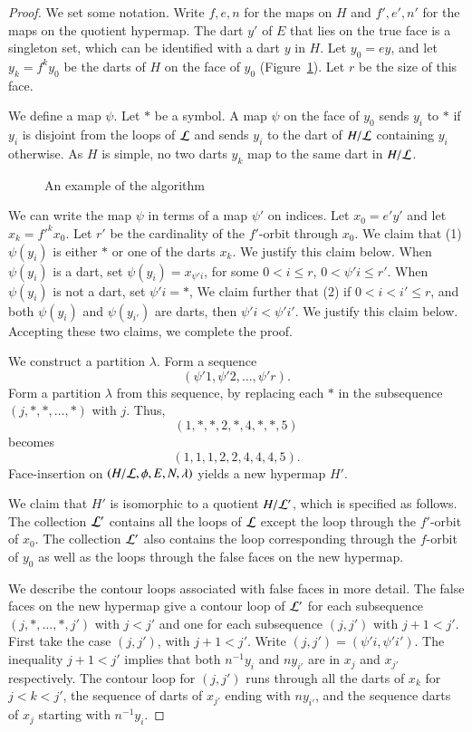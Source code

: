 \begin{proof}  We set some notation.
Write $f,e,n$ for the maps on $H$ and $f',e',n'$ for the maps on the
quotient hypermap.   
The dart $y'$ of $E$ that 
lies on the true face is a
singleton set, which can be identified with a dart $y$ in $H$.  Let
$y_0 = e y$, and let $y_k = {f}^k y_0$ be the darts of $H$ on the
face of $y_0$ (Figure~\ref{fig:algordart}).  
Let $r$ be the size of this face. 

We define a map $\psi$.
Let $*$ be a symbol.
A map
$\psi$ on the face of $y_0$ sends 
$y_i$ to $*$ if $y_i$ is disjoint from
the loops of ${\cal L}$ and sends $y_i$
to the dart of $H/{\cal L}$
containing $y_i$ otherwise.
As $H$ is simple, no two darts
$y_k$ map to the same dart in $H/{\cal L}$.
\begin{figure}[htb]
  \centering
  \caption{An example of the algorithm}
  \label{fig:algordart}
\end{figure}

We can write the map $\psi$ in terms of a map $\psi'$ on indices.
Let $x_0 = e' y'$ and let $x_k = {f'}^k x_0$.  Let $r'$ be the
cardinality of the $f'$-orbit through $x_0$.  
We claim that (1) $\psi(y_i)$ is either $*$ or one of the
darts $x_k$.  We justify this claim below.
When $\psi(y_i)$ is a dart, set $\psi(y_i) =
x_{\psi' i}$, for some $0< i \le r$, $0 < \psi' i \le r'$. 
When $\psi(y_i)$ is not a dart,
set $\psi' i = *$, 
We claim further that (2) if
$0< i< i'\le r$, and both $\psi(y_i)$ and $\psi(y_{i'})$ are darts, then
$\psi' i < \psi' i'$.  We justify this claim below.
Accepting these two claims, we complete the proof.    

We construct a partition $\lambda$.
Form a sequence
    $$(\psi' 1,\psi' 2,\ldots,\psi' r).$$
Form a partition $\lambda$ from this sequence, 
by replacing each $*$ in the
subsequence $(j,*,*,\ldots,*)$ with $j$. Thus,
    $$(1,*,*,2,*,4,*,*,5)$$
becomes
    $$(1,1,1,2,2,4,4,4,5).$$
Face-insertion on $(H/{\cal L},\phi,E,N,\lambda)$ yields a new
hypermap $H'$.  

We claim that $H'$ is isomorphic to a quotient
$H/{\cal L}'$, which is specified as follows. The collection
${\cal L}'$ contains all the loops of ${\cal L}$ 
except the loop through the $f'$-orbit of $x_0$.  The collection
${\cal L}'$ also contains
the loop corresponding through the $f$-orbit
of $y_0$ as well as the loops through the false faces on
the new hypermap.  

We describe the contour loops associated with false faces 
in more detail.
The false faces on the new hypermap give a
contour loop of ${\cal L}'$ for each subsequence
$(j,*,\ldots,*,j')$ with $j< j'$ 
and one for each subsequence $(j,j')$ with
$j+1< j'$.  
First take the case $(j,j')$, with $j+1<j'$. 
Write $(j,j') = (\psi'i,\psi' i')$.
The inequality $j+1<j'$ implies that both $n^{-1}
y_i$ and $n y_{i'}$ are in $x_j$ and $x_{j'}$ respectively.
The contour loop for $(j,j')$ runs through 
all the darts of $x_k$ for $j<k<j'$,
the sequence of darts of $x_{j'}$ ending with $n y_{i'}$,
and the sequence darts of $x_j$ starting with $n^{-1} y_i$.


\end{proof}
